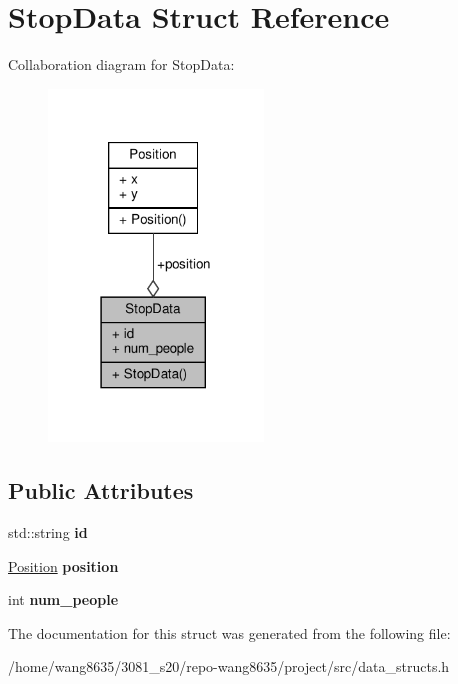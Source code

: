\hypertarget{structStopData}{}\section{Stop\+Data Struct Reference}
\label{structStopData}


Collaboration diagram for Stop\+Data\+:
\nopagebreak
\begin{figure}[H]
\begin{center}
\leavevmode
\includegraphics[width=162pt]{structStopData__coll__graph}
\end{center}
\end{figure}
\subsection*{Public Attributes}
\begin{DoxyCompactItemize}
\item 
\mbox{\label{structStopData_abf63e623637d887c203c2a02b0855bb4}} 
std\+::string {\bfseries id}
\item 
\mbox{\label{structStopData_ae2e45d96bcd5b5f262796a6200a14fda}} 
\hyperlink{structPosition}{Position} {\bfseries position}
\item 
\mbox{\label{structStopData_ac8346b0259972f304061a205d3f75f80}} 
int {\bfseries num\+\_\+people}
\end{DoxyCompactItemize}


The documentation for this struct was generated from the following file\+:\begin{DoxyCompactItemize}
\item 
/home/wang8635/3081\+\_\+s20/repo-\/wang8635/project/src/data\+\_\+structs.\+h\end{DoxyCompactItemize}
